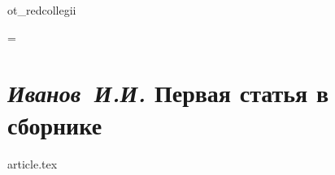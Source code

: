 \documentclass[openany, twoside, a5paper, 10pt]{extbook}
\makeatletter
\newcommand{\unchapter}[1]{%
    \begingroup
    \let\@makechapterhead\@gobble %
    \chapter{#1}
    \endgroup
}
\newcommand{\AddRefPrefix}[1]{
    \renewcommand{\PageRef}[1]{\pageref{#1##1}}
    \renewcommand{\LabelRef}[1]{\ref{#1##1}}
    \renewcommand{\Label}[1]{\label{#1##1}}
}
\newcommand{\LabelRef}[1]{\ref{#1}}
\newcommand{\PageRef}[1]{\pageref{#1}}
\newcommand{\Label}[1]{\label{#1}}
\makeatother
\begin{document}
    \renewcommand{\thelstlisting}{\arabic{lstlisting}}
    \setcounter{page}{3}
    \setcounter{tocdepth}{0}
    \tableofcontents
    \newpage

    {ot_redcollegii}

    \justifying
    \emergencystretch=\maxdimen

    \unchapter{\textnormal{\textit{Иванов~И.И.}} Первая статья в сборнике}
    \AddRefPrefix{th1}
    {article.tex}
\end{document}

